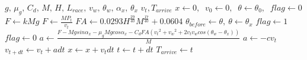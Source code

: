 \documentclass{article}
\begin{document}
 
	\begin{algorithm} 
		\renewcommand{\algorithmicrequire}{\textbf{Input:}}
		\renewcommand{\algorithmicensure}{\textbf{Output:}}
		\caption{$v_t, T_{arrive}$ $Simulation$ $calculation$} 
		\label{alg1} 
		\begin{algorithmic}[1]
			\REQUIRE $g,\,\mu_g,\,C_d,\,M,\,H,\,L_{race},\,v_w,\,\theta_w,\,\alpha_x,\,\theta_x$
			\ENSURE $v_t, T_{arrive}$
			\STATE $x \gets 0,\ $ $v_0 \gets 0,\ $
			 $\theta \gets \theta_0 ,\ $ $flag \gets 0$
			\STATE $F \gets kMg$
			\ELSE
			\STATE $F \gets \frac{MP_t}{v_t}$
			\ENDIF
			\STATE $FA \gets 0.0293H^{\frac{29}{40}}M^{\frac{17}{40}}+0.0604$
			\STATE $\theta_{before} \gets \theta ,\ \theta \gets \theta_x$
			\STATE	$flag \gets 1$
			\ENDIF
			\STATE	$flag \gets 0$
			\ENDIF
			\STATE $a \gets \frac{F-Mgsin\alpha_x-\mu_gMgcos\alpha_x-C_dFA({v_t}^2+{v_w}^2+2v_tv_wcos(\theta_w-\theta_x))}{M}$
			\ELSE
			\STATE $a \gets -cv_t$
			\ENDIF
			\STATE $v_{t+dt} \gets v_{t}+adt$
			\STATE $x \gets x+v_{t}dt$
			\STATE $t \gets t+dt$
			\ENDWHILE 		
			\STATE $T_{arrive} \gets t$
		\end{algorithmic} 
	\end{algorithm}
\end{document}

